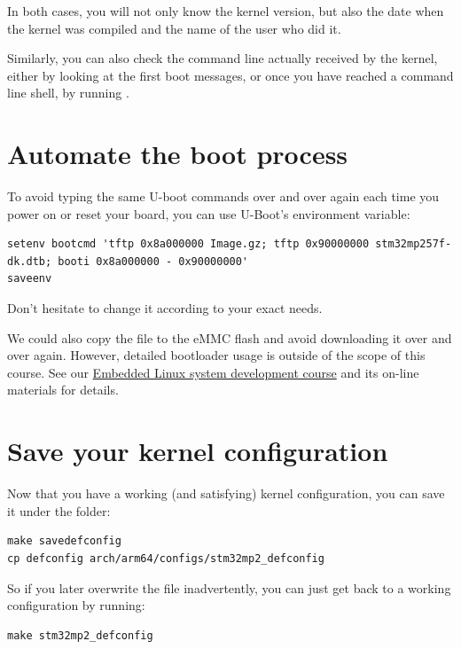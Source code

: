 In both cases, you will not only know the kernel version, but also
the date when the kernel was compiled and the name of the user who
did it.

Similarly, you can also check the command line actually received by
the kernel, either by looking at the first boot messages, or once you
have reached a command line shell, by running .

\section{Automate the boot process}

To avoid typing the same U-boot commands over and over again each time
you power on or reset your board, you can use U-Boot's 
environment variable:

{\footnotesize
\begin{verbatim}
setenv bootcmd 'tftp 0x8a000000 Image.gz; tftp 0x90000000 stm32mp257f-dk.dtb; booti 0x8a000000 - 0x90000000'
saveenv
\end{verbatim}
}

Don't hesitate to change it according to your exact needs.

We could also copy the  file to the eMMC flash and avoid
downloading it over and over again. However, detailed bootloader
usage is outside of the scope of this course. See our
\href{https://bootlin.com/training/embedded-linux/}{Embedded
Linux system development course} and its on-line materials for
details.

\section{Save your kernel configuration}

Now that you have a working (and satisfying) kernel configuration, you
can save it under the  folder:

\begin{verbatim}
make savedefconfig
cp defconfig arch/arm64/configs/stm32mp2_defconfig
\end{verbatim}

So if you later overwrite the  file inadvertently, you can
just get back to a working configuration by running:

\begin{verbatim}
make stm32mp2_defconfig
\end{verbatim}
